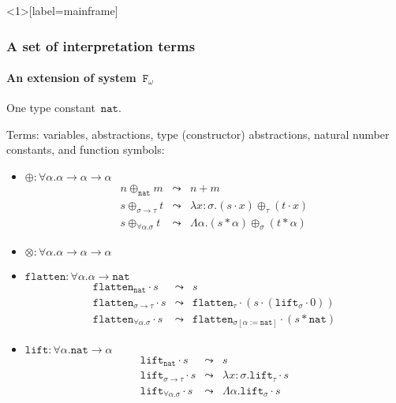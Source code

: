 \documentclass[10pt,presentation,color=names]{beamer}
\newcommand{\Fomega}{\mathtt{F}_\omega}
\newcommand{\arrtype}{\rightarrow}
\newcommand{\quant}[2]{\forall #1.#2}
\newcommand{\app}[2]{#1 \cdot #2}
\newcommand{\tapp}[2]{#1 * #2}
\newcommand{\subst}[2]{#1:=#2}
\newcommand{\abs}[2]{\lambda #1.#2}
\newcommand{\tabs}[2]{\Lambda #1.#2}
\newcommand{\arrW}{\leadsto}
\newcommand{\nat}{\mathtt{nat}}
\newcommand{\flatten}{\mathtt{flatten}}
\newcommand{\lift}{\mathtt{lift}}
\begin{document}
\begin{frame}<1>[label=mainframe]
  \frametitle{A set of interpretation terms}
  \framesubtitle{An extension of system~$\Fomega$}
  One type constant~$\nat$.\pause

  \medskip

  Terms: variables, abstractions, type (constructor) abstractions,
  natural number constants, and function symbols\pause:
  \begin{itemize}
  \item $\oplus : \forall \alpha . \alpha \arrtype \alpha \arrtype
    \alpha$\pause
    \[
    \begin{array}{rcl}
      n \oplus_{\nat} m &\arrW& n+m\\
      s \oplus_{\sigma \arrtype \tau} t &\arrW&
      \abs{x:\sigma}{(\app{s}{x}) \oplus_\tau (\app{t}{x})}\\
      s \oplus_{\quant{\alpha}{\sigma}} t &\arrW&
      \tabs{\alpha}{(\tapp{s}{\alpha}) \oplus_\sigma (\tapp{t}{\alpha})}
    \end{array}
    \]\pause
  \item $\otimes : \forall \alpha . \alpha \arrtype \alpha \arrtype
    \alpha$\pause
  \item $\flatten : \forall \alpha . \alpha \arrtype \nat$\pause
    \[
    \begin{array}{rcl}
      \app{\flatten_\nat}{s} &\arrW& s\\
      \app{\flatten_{\sigma \arrtype \tau}}{s} &\arrW& \app{\flatten_\tau}{(\app{s}{(\app{\lift_\sigma}{0})})}\\
      \app{\flatten_{\quant{\alpha}{\sigma}}}{s} &\arrW& \app{\flatten_{\sigma[\subst{\alpha}{\nat}]}}{(\tapp{s}{\nat})}
    \end{array}
    \]\pause
  \item $\lift : \forall \alpha . \nat \arrtype \alpha$\pause
    \[
    \begin{array}{rcl}
      \app{\lift_\nat}{s} &\arrW& s\\
      \app{\lift_{\sigma \arrtype \tau}}{s} &\arrW& \abs{x:\sigma}{\app{\lift_{\tau}}{s}}\\
      \app{\lift_{\quant{\alpha}{\sigma}}}{s} &\arrW& \tabs{\alpha}{\app{\lift_{\sigma}}{s}}
    \end{array}
    \]
  \end{itemize}
\end{frame}
\end{document}
